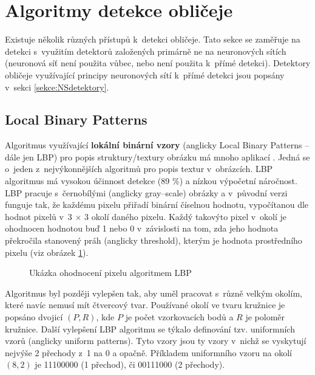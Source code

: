 \section{Algoritmy detekce obličeje}
\label{sekce:detektory_bez_neuronovych_siti}
Existuje několik různých přístupů k~detekci obličeje. Tato sekce se zaměřuje na detekci s~využitím detektorů založených primárně ne na neuronových sítích (neuronová síť není použita vůbec, nebo není použita k~přímé detekci). Detektory obličeje využívající principy neuronových sítí k~přímé detekci jsou popsány v~sekci \ref{sekce:NSdetektory}.

\subsection*{Local Binary Patterns}
Algoritmus využívající \textbf{lokální binární vzory} (anglicky Local Binary Patterns -- dále jen LBP) pro popis struktury/textury obrázku má mnoho aplikací \cite{localBinaryPatterns}. Jedná se o~jeden z~nejvýkonnějších algoritmů pro popis textur v~obrázcích. LBP algoritmus má vysokou účinnost detekce (89 \%) \cite{localBinaryPatternsTests} a nízkou výpočetní náročnost.
LBP pracuje s~černobílými (anglicky gray--scale) obrázky a v~původní verzi funguje tak, že každému pixelu přiřadí binární číselnou hodnotu, vypočítanou dle hodnot pixelů v~3 $\times$ 3 okolí daného pixelu. Každý takovýto pixel v~okolí je ohodnocen hodnotou buď 1 nebo 0 v~závislosti na tom, zda jeho hodnota překročila stanovený práh (anglicky threshold), kterým je hodnota prostředního pixelu (viz obrázek \ref{lbp}).

\begin{figure}[H]
  \begin{center}
  \label{lbp}
  \caption{Ukázka ohodnocení pixelu algoritmem LBP \cite{localBinaryPatterns}}
  \end{center}
\end{figure}

Algoritmus byl později vylepšen tak, aby uměl pracovat s~různě velkým okolím, které navíc nemusí mít čtvercový tvar. Používané okolí ve tvaru kružnice je popsáno dvojicí $(P, R)$, kde $P$ je počet vzorkovacích bodů a $R$ je poloměr kružnice. Další vylepšení LBP algoritmu se týkalo definování tzv. uniformních vzorů (anglicky uniform patterns). Tyto vzory jsou ty vzory v~nichž se vyskytují nejvýše 2 přechody z~1 na 0 a opačně. Příkladem uniformního vzoru na okolí $(8, 2)$ je 11100000 (1 přechod), či 00111000 (2 přechody). 

